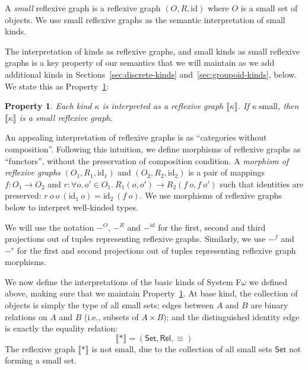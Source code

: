 \documentclass[preprint]{sigplanconf}
\newtheorem{property}{Property}
\theoremstyle{examplestyle}
\newcommand{\sem}[1]{\llbracket #1 \rrbracket}
\newcommand{\Set}{\mathsf{Set}}
\newcommand{\Rel}{\mathsf{Rel}}
\begin{document}
A \emph{small} reflexive graph is a reflexive graph $(O, R,
\mathrm{id})$ where $O$ is a small set of objects. We use small
reflexive graphs as the semantic interpretation of small kinds.

The interpretation of kinds as reflexive graphs, and small kinds as
small reflexive graphs is a key property of our semantics that we will
maintain as we add additional kinds in
Sections~\ref{sec:discrete-kinds} and~\ref{sec:groupoid-kinds},
below. We state this as Property~\ref{property:semantic-kinds}:

\begin{property}\label{property:semantic-kinds}
  Each kind $\kappa$ is interpreted as a reflexive graph
  $\sem{\kappa}$. If $\kappa~\mathrm{small}$, then $\sem{\kappa}$ is a
  small reflexive graph.
\end{property}

An appealing interpretation of reflexive graphs is as ``categories
without composition''. Following this intuition, we define morphisms
of reflexive graphs as ``functors'', without the preservation of
composition condition. A \emph{morphism of reflexive graphs}
$(O_1,R_1,\mathrm{id}_1)$ and $(O_2, R_2, \mathrm{id}_2)$ is a pair of
mappings $f : O_1 \to O_2$ and $r : \forall o, o' \in
O_1.~R_1(o,o') \to R_2(f~o, f~o')$ such that identities are
preserved: $r~o~o~(\mathrm{id}_1~o) = \mathrm{id}_2~(f~o)$. We use
morphisms of reflexive graphs below to interpret well-kinded types.

We will use the notation $-^O$, $-^R$ and $-^{\mathrm{id}}$ for the
first, second and third projections out of tuples representing
reflexive graphs. Similarly, we use $-^f$ and $-^r$ for the first and
second projections out of tuples representing reflexive graph
morphisms.

We now define the interpretations of the basic kinds of System
F$\omega$ we defined above, making sure that we maintain
Property~\ref{property:semantic-kinds}. At base kind, the collection
of objects is simply the type of all small sets; edges between $A$ and
$B$ are binary relations on $A$ and $B$ (i.e., subsets of $A \times
B$); and the distinguished identity edge is exactly the equality
relation:
\begin{displaymath}
  \sem{*} = (\Set, \Rel, \equiv)
\end{displaymath}
The reflexive graph $\sem{*}$ is not small, due to the collection of
all small sets $\Set$ not forming a small set.
\end{document}
